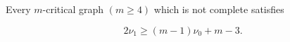 Every $m$-critical graph $(m \geq 4)$ which is not complete satisfies

$$2\nu_1 \geq (m - 1)\nu_0 + m - 3.$$
